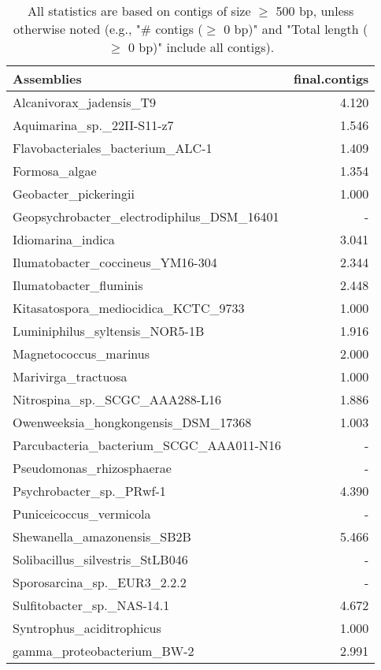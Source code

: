 \documentclass[12pt,a4paper]{article}
\begin{document}
\begin{table}[ht]
\begin{center}
\caption{All statistics are based on contigs of size $\geq$ 500 bp, unless otherwise noted (e.g., "\# contigs ($\geq$ 0 bp)" and "Total length ($\geq$ 0 bp)" include all contigs).}
\begin{tabular}{|l*{1}{|r}|}
\hline
Assemblies & final.contigs \\ \hline
Alcanivorax\_jadensis\_T9 & 4.120 \\ \hline
Aquimarina\_sp.\_22II-S11-z7 & 1.546 \\ \hline
Flavobacteriales\_bacterium\_ALC-1 & 1.409 \\ \hline
Formosa\_algae & 1.354 \\ \hline
Geobacter\_pickeringii & 1.000 \\ \hline
Geopsychrobacter\_electrodiphilus\_DSM\_16401 & - \\ \hline
Idiomarina\_indica & 3.041 \\ \hline
Ilumatobacter\_coccineus\_YM16-304 & 2.344 \\ \hline
Ilumatobacter\_fluminis & 2.448 \\ \hline
Kitasatospora\_mediocidica\_KCTC\_9733 & 1.000 \\ \hline
Luminiphilus\_syltensis\_NOR5-1B & 1.916 \\ \hline
Magnetococcus\_marinus & 2.000 \\ \hline
Marivirga\_tractuosa & 1.000 \\ \hline
Nitrospina\_sp.\_SCGC\_AAA288-L16 & 1.886 \\ \hline
Owenweeksia\_hongkongensis\_DSM\_17368 & 1.003 \\ \hline
Parcubacteria\_bacterium\_SCGC\_AAA011-N16 & - \\ \hline
Pseudomonas\_rhizosphaerae & - \\ \hline
Psychrobacter\_sp.\_PRwf-1 & 4.390 \\ \hline
Puniceicoccus\_vermicola & - \\ \hline
Shewanella\_amazonensis\_SB2B & 5.466 \\ \hline
Solibacillus\_silvestris\_StLB046 & - \\ \hline
Sporosarcina\_sp.\_EUR3\_2.2.2 & - \\ \hline
Sulfitobacter\_sp.\_NAS-14.1 & 4.672 \\ \hline
Syntrophus\_aciditrophicus & 1.000 \\ \hline
gamma\_proteobacterium\_BW-2 & 2.991 \\ \hline
\end{tabular}
\end{center}
\end{table}
\end{document}
